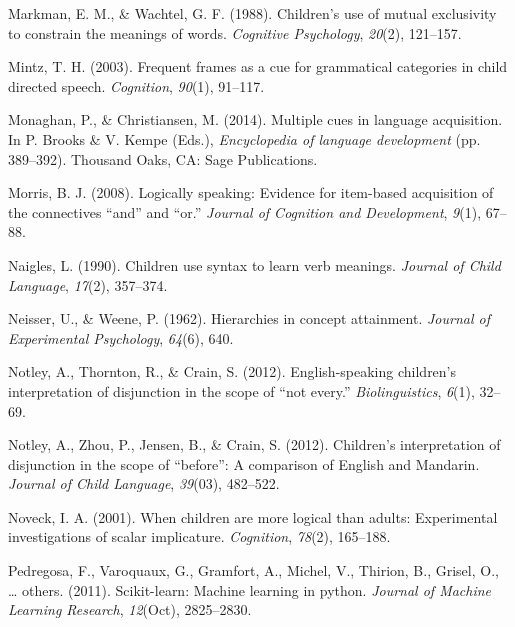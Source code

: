 \documentclass[
  ,man,floatsintext]{apa6}
\newlength{\cslhangindent}
\newlength{\cslentryspacingunit} %
\newenvironment{CSLReferences}[2] %
 {%
  \setlength{\parindent}{0pt}
  \ifodd #1
  \let\oldpar\par
  \def\par{\hangindent=\cslhangindent\oldpar}
  \fi
  \setlength{\parskip}{#2\cslentryspacingunit}
 }%
 {}
\begin{document}
\begin{CSLReferences}{1}{0}
\leavevmode{}%
Markman, E. M., \& Wachtel, G. F. (1988). Children's use of mutual exclusivity to constrain the meanings of words. \emph{Cognitive Psychology}, \emph{20}(2), 121--157.

\leavevmode{}%
Mintz, T. H. (2003). Frequent frames as a cue for grammatical categories in child directed speech. \emph{Cognition}, \emph{90}(1), 91--117.

\leavevmode{}%
Monaghan, P., \& Christiansen, M. (2014). Multiple cues in language acquisition. In P. Brooks \& V. Kempe (Eds.), \emph{Encyclopedia of language development} (pp. 389--392). Thousand Oaks, CA: Sage Publications.

\leavevmode{}%
Morris, B. J. (2008). Logically speaking: Evidence for item-based acquisition of the connectives {``and''} and {``or.''} \emph{Journal of Cognition and Development}, \emph{9}(1), 67--88.

\leavevmode{}%
Naigles, L. (1990). Children use syntax to learn verb meanings. \emph{Journal of Child Language}, \emph{17}(2), 357--374.

\leavevmode{}%
Neisser, U., \& Weene, P. (1962). Hierarchies in concept attainment. \emph{Journal of Experimental Psychology}, \emph{64}(6), 640.

\leavevmode{}%
Notley, A., Thornton, R., \& Crain, S. (2012). English-speaking children's interpretation of disjunction in the scope of {``not every.''} \emph{Biolinguistics}, \emph{6}(1), 32--69.

\leavevmode{}%
Notley, A., Zhou, P., Jensen, B., \& Crain, S. (2012). Children's interpretation of disjunction in the scope of {``before''}: A comparison of {English} and {M}andarin. \emph{Journal of Child Language}, \emph{39}(03), 482--522.

\leavevmode{}%
Noveck, I. A. (2001). When children are more logical than adults: Experimental investigations of scalar implicature. \emph{Cognition}, \emph{78}(2), 165--188.

\leavevmode{}%
Pedregosa, F., Varoquaux, G., Gramfort, A., Michel, V., Thirion, B., Grisel, O., \ldots{} others. (2011). Scikit-learn: Machine learning in python. \emph{Journal of Machine Learning Research}, \emph{12}(Oct), 2825--2830.


\end{CSLReferences}
\end{document}
